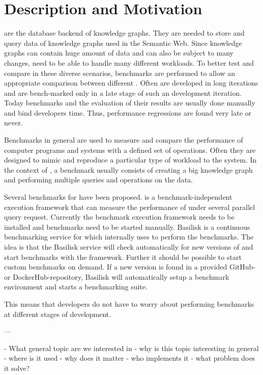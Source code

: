 \chapter{Description and Motivation}
\label{ch:description}

\tsp{} are the database backend of knowledge graphs. 
They are needed to store and query data of knowledge graphs used in the Semantic Web.
Since knowledge graphs can contain huge amount of data and can also be subject to many changes, \tsp{} need to be able to handle many different workloads.
To better test and compare \tsp{} in these diverse scenarios, benchmarks are performed to allow an appropriate comparison between different \tsp{}.
Often \tsp{} are developed in long iterations and are bench-marked only in a late stage of such an development iteration.
Today benchmarks and the evaluation of their results are usually done manually and bind developers time.
Thus, performance regressions are  found very late or never.

Benchmarks in general are used to measure and compare the performance of computer programs and systems with a defined set of operations.
Often they are designed to mimic and reproduce a particular type of workload to the system.
In the context of \tsp{}, a benchmark usually consists of creating a big knowledge graph and performing multiple queries and operations on the data.

Several benchmarks for \tsp{} have been proposed.
\iguana{} is a benchmark-independent execution framework \cite{IGUANA} that can measure the performance of \tsp{} under several parallel query request.
Currently the benchmark execution framework needs to be installed and benchmarks need to be started manually.
Basilisk is a continuous benchmarking service for \tsp{} which internally uses \iguana{} to perform the benchmarks.
The idea is that the Basilisk service will check automatically for new versions of \tsp{} and start benchmarks with the \iguana{} framework.
Further it should be possible to start custom benchmarks on demand.
If a new version is found in a provided GitHub- or DockerHub-repository, Basilisk will automatically setup a benchmark environment and starts a benchmarking suite.

This means that developers do not have to worry about performing benchmarks at different stages of development.



---

- What general topic are we interested in
- why is this topic interesting in general
- where is it used
- why does it matter
- who implements it
- what problem does it solve?

